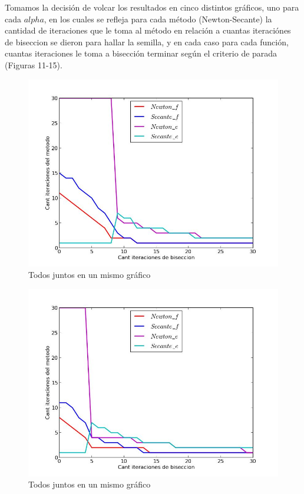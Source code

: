 Tomamos la decisión de volcar los resultados en cinco distintos gráficos, uno para cada $alpha$, en los cuales se refleja para cada método (Newton-Secante) la cantidad de iteraciones que le toma al método en relación a cuantas iteraciónes de biseccion se dieron para hallar la semilla, y en cada caso para cada función, cuantas iteraciones le toma a bisección terminar según el criterio de parada (Figuras 11-15).

\begin{figure}[!h]
	\begin{center}
		  \includegraphics[keepaspectratio]{../Imagenes/exp4/experimento_biseccion_1.jpg}
		  \caption{Todos juntos en un mismo gráfico}
		  \label{fig:contra1}
	\end{center}
\end{figure}
\FloatBarrier

\begin{figure}[!h]
	\begin{center}
		  \includegraphics[keepaspectratio]{../Imagenes/exp4/experimento_biseccion_2.jpg}
		  \caption{Todos juntos en un mismo gráfico}
		  \label{fig:contra1}
	\end{center}
\end{figure}
\FloatBarrier


